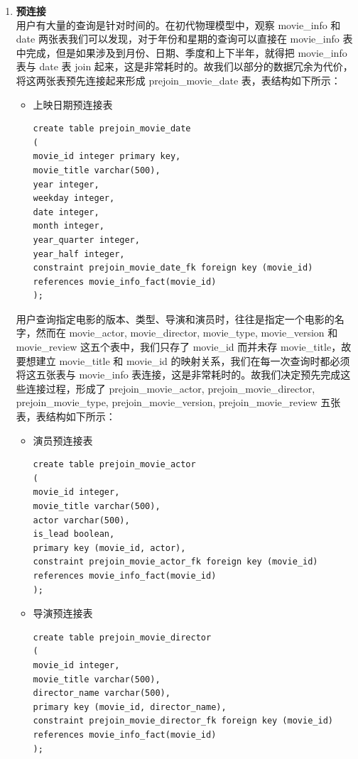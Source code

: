 \documentclass{ctexrep}
\begin{document}
\begin{enumerate}
        \item \textbf{预连接}\\
        用户有大量的查询是针对时间的。在初代物理模型中，观察 movie\_info 和 date 两张表我们可以发现，对于年份和星期的查询可以直接在 movie\_info 表中完成，但是如果涉及到月份、日期、季度和上下半年，就得把 movie\_info 表与 date 表 join 起来，这是非常耗时的。故我们以部分的数据冗余为代价，将这两张表预先连接起来形成 prejoin\_movie\_date 表，表结构如下所示：
        \begin{itemize}
            \item 上映日期预连接表
                \begin{lstlisting}
create table prejoin_movie_date
(
movie_id integer primary key,
movie_title varchar(500),
year integer,
weekday integer,
date integer,
month integer,
year_quarter integer,
year_half integer,
constraint prejoin_movie_date_fk foreign key (movie_id) references movie_info_fact(movie_id)
);
                \end{lstlisting}
        \end{itemize}
        用户查询指定电影的版本、类型、导演和演员时，往往是指定一个电影的名字，然而在 movie\_actor, movie\_director, movie\_type, movie\_version 和 movie\_review 这五个表中，我们只存了 movie\_id 而并未存 movie\_title，故要想建立 movie\_title 和 movie\_id 的映射关系，我们在每一次查询时都必须将这五张表与 movie\_info 表连接，这是非常耗时的。故我们决定预先完成这些连接过程，形成了 prejoin\_movie\_actor, prejoin\_movie\_director, prejoin\_movie\_type, prejoin\_movie\_version, prejoin\_movie\_review 五张表，表结构如下所示：
        \begin{itemize}
            \item 演员预连接表
                \begin{lstlisting}
create table prejoin_movie_actor
(
movie_id integer,
movie_title varchar(500),
actor varchar(500),
is_lead boolean,
primary key (movie_id, actor),
constraint prejoin_movie_actor_fk foreign key (movie_id) references movie_info_fact(movie_id)
);
                \end{lstlisting}
            \item 导演预连接表
                \begin{lstlisting}
create table prejoin_movie_director
(
movie_id integer,
movie_title varchar(500),
director_name varchar(500),
primary key (movie_id, director_name),
constraint prejoin_movie_director_fk foreign key (movie_id) references movie_info_fact(movie_id)
);
                \end{lstlisting}

\end{itemize}
\end{enumerate}
\end{document}
